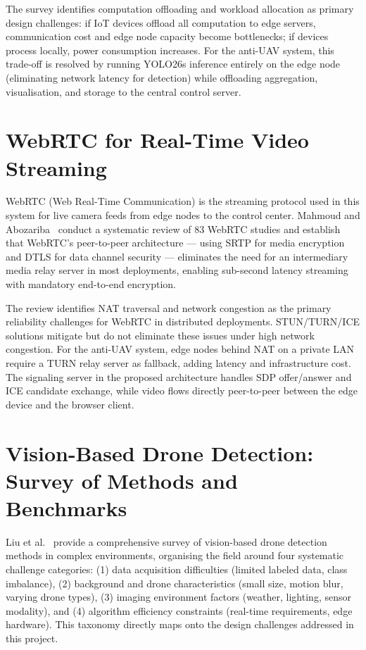 \documentclass[12pt,a4paper]{report}
\begin{document}
The survey identifies computation offloading and workload allocation as
primary design challenges: if IoT devices offload all computation to edge
servers, communication cost and edge node capacity become bottlenecks; if
devices process locally, power consumption increases. For the anti-UAV
system, this trade-off is resolved by running YOLO26s inference entirely
on the edge node (eliminating network latency for detection) while
offloading aggregation, visualisation, and storage to the central control
server.

\section{WebRTC for Real-Time Video Streaming}

WebRTC (Web Real-Time Communication) is the streaming protocol used in
this system for live camera feeds from edge nodes to the control center.
Mahmoud and Abozariba~\cite{mahmoud2025webrtc} conduct a systematic review
of 83 WebRTC studies and establish that WebRTC's peer-to-peer architecture
--- using SRTP for media encryption and DTLS for data channel security ---
eliminates the need for an intermediary media relay server in most
deployments, enabling sub-second latency streaming with mandatory
end-to-end encryption.

The review identifies NAT traversal and network congestion as the primary
reliability challenges for WebRTC in distributed deployments. STUN/TURN/ICE
solutions mitigate but do not eliminate these issues under high network
congestion. For the anti-UAV system, edge nodes behind NAT on a private
LAN require a TURN relay server as fallback, adding latency and
infrastructure cost. The signaling server in the proposed architecture
handles SDP offer/answer and ICE candidate exchange, while video flows
directly peer-to-peer between the edge device and the browser client.

\section{Vision-Based Drone Detection: Survey of Methods and Benchmarks}

Liu et al.~\cite{liu2024survey} provide a comprehensive survey of
vision-based drone detection methods in complex environments, organising
the field around four systematic challenge categories: (1) data acquisition
difficulties (limited labeled data, class imbalance), (2) background and
drone characteristics (small size, motion blur, varying drone types),
(3) imaging environment factors (weather, lighting, sensor modality), and
(4) algorithm efficiency constraints (real-time requirements, edge hardware).
This taxonomy directly maps onto the design challenges addressed in this project.
\end{document}
